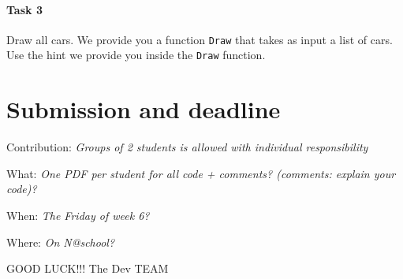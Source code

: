 \documentclass[10pt,a4paper]{article}
\begin{document}
\paragraph{Task 3} Draw all cars. We provide you a function \texttt{Draw} that takes as input a list of cars. Use the hint we provide you inside the \texttt{Draw} function.

\section{Submission and deadline}

\noindent
Contribution: \textit{Groups of 2 students is allowed with individual responsibility}

\noindent
What: \textit{One PDF per student for all code + comments? (comments: explain your code)?}

\noindent
When: \textit{The Friday of week 6?}

\noindent
Where: \textit{On N@school?}


\vspace{5cm}
\huge
\centering
GOOD LUCK!!! The Dev TEAM  \smiley

	
\end{document}
